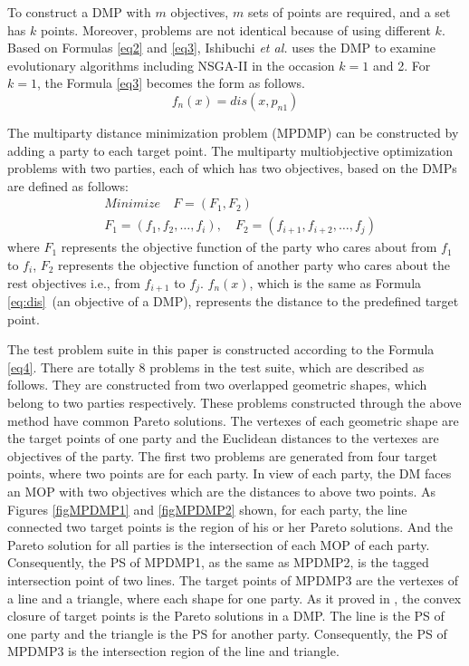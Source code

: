 \documentclass[preprint,12pt]{elsarticle}
\begin{document}
To construct a DMP with $m$ objectives, $m$ sets of points are required, and a set has $k$ points.
Moreover, problems are not identical because of using different $k$.
Based on Formulas \eqref{eq2} and \eqref{eq3}, Ishibuchi \textit{et al.} uses the DMP to examine evolutionary algorithms including NSGA-II in the occasion $k= 1$ and 2.
For $k=1$, the Formula \eqref{eq3} becomes the form as follows.
\begin{equation} \label{eq:dis}
	f_n(x) = dis(x, p_{n1})
\end{equation}

The multiparty distance minimization problem (MPDMP) can be constructed by adding a party to each target point.
The multiparty multiobjective optimization problems with two parties, each of which has two objectives, based on the DMPs are defined as follows:
\begin{equation}\label{eq4}
	\begin{aligned}
		 & Minimize \quad F = (F_1, F_2)                                                \\
		 & F_1 = (f_1, f_2, \dots, f_{i}), \quad F_2 = (f_{i+1}, f_{i+2}, \dots, f_{j})
	\end{aligned}
\end{equation}
where $F_1$ represents the objective function of the party who cares about from $f_{1}$ to $f_{i}$,  $F_2$ represents the objective function of another party who cares about the rest objectives i.e., from $f_{i+1}$ to $f_{j}$.
$f_n(x)$, which is the same as Formula \eqref{eq:dis}~(an objective of a DMP), represents the distance to the predefined target point.

The test problem suite in this paper is constructed according to the Formula \eqref{eq4}.
There are totally 8 problems in the test suite, which are described as follows.
They are constructed from two overlapped geometric shapes, which belong to two parties respectively.
These problems constructed through the above method have common Pareto solutions.
The vertexes of each geometric shape are the target points of one party and the Euclidean distances to the vertexes are objectives of the party.
The first two problems are generated from four target points, where two points are for each party.
In view of each party, the DM faces an MOP with two objectives which are the distances to above two points.
As Figures \ref{figMPDMP1} and \ref{figMPDMP2} shown, for each party, the line connected two target points is the region of his or her Pareto solutions.
And the Pareto solution for all parties is the intersection of each MOP of each party.
Consequently, the PS of MPDMP1, as the same as MPDMP2, is the tagged intersection point of two lines.
The target points of MPDMP3 are the vertexes of a line and a triangle, where each shape for one party.
As it proved in \cite{Koppen2007}, the convex closure of target points is the Pareto solutions in a DMP.
The line is the PS of one party and the triangle is the PS for another party.
Consequently, the PS of MPDMP3 is the intersection region of the line and triangle.
\end{document}
